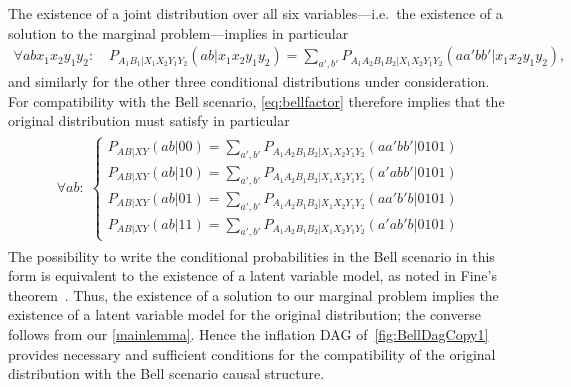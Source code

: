 \documentclass[aps,english,superscriptaddress,onecolumn,twoside,longbibliography,pra,floatfix,fleqn,nofootinbib]{revtex4-1}%
\theoremstyle{definition}
\begin{document}
The existence of a joint distribution over all six variables---i.e.~the existence of a solution to the marginal problem---implies in particular
\begin{align}
	\forall{a b x_1 x_2 y_1 y_2}: \quad P_{A_1 B_1 | X_1 X_2 Y_1 Y_2}(a b | x_1 x_2 y_1 y_2)  =  \sum\nolimits_{a',b'} P_{A_1 A_2 B_1 B_2 | X_1 X_2 Y_1 Y_2}(a a' b b'|x_1 x_2 y_1 y_2),
\end{align}
and similarly for the other three conditional distributions under consideration. For compatibility with the Bell scenario, \cref{eq:bellfactor} therefore implies that the original distribution must satisfy in particular
\begin{align}\begin{split}\label{eq:finalBellstep}\forall{a b}:\; \begin{cases}
	P_{A B | X Y}(a b | 0 0)  =  \sum\nolimits_{a',b'} P_{A_1 A_2 B_1 B_2| X_1 X_2 Y_1 Y_2}(a a' b b'|0101) \\
	P_{A B | X Y}(a b | 1 0)  =  \sum\nolimits_{a',b'} P_{A_1 A_2 B_1 B_2| X_1 X_2 Y_1 Y_2}(a' a b b'|0101) \\
	P_{A B | X Y}(a b | 0 1)  =  \sum\nolimits_{a',b'} P_{A_1 A_2 B_1 B_2| X_1 X_2 Y_1 Y_2}(a a' b' b|0101) \\
	P_{A B | X Y}(a b | 1 1)  =  \sum\nolimits_{a',b'} P_{A_1 A_2 B_1 B_2| X_1 X_2 Y_1 Y_2}(a' a b' b|0101)
\end{cases}\end{split}\end{align}
The possibility to write the conditional probabilities in the Bell scenario in this form is equivalent to the existence of a latent variable model, as noted in Fine's theorem~\cite{FineTheorem}. Thus, the existence of a solution to our marginal problem implies the existence of a latent variable model for the original distribution; the converse follows from our \cref{mainlemma}. Hence the inflation DAG of~\cref{fig:BellDagCopy1} provides necessary and sufficient conditions for the compatibility of the original distribution with the Bell scenario causal structure.
\end{document}
